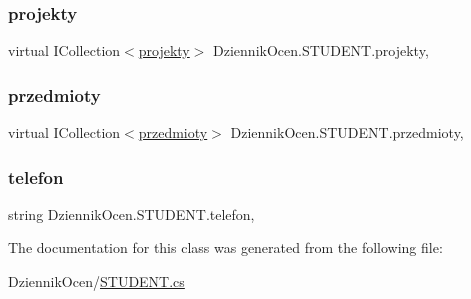 \subsubsection{\texorpdfstring{projekty}{projekty}}
{\footnotesize\ttfamily virtual I\+Collection$<$\hyperlink{class_dziennik_ocen_1_1projekty}{projekty}$>$ Dziennik\+Ocen.\+S\+T\+U\+D\+E\+N\+T.\+projekty\hspace{0.3cm}{\ttfamily [get]}, {\ttfamily [set]}}

\mbox{\label{class_dziennik_ocen_1_1_s_t_u_d_e_n_t_a090aaef3f9d6a0d20e319d773b2a4cbb}} 
\subsubsection{\texorpdfstring{przedmioty}{przedmioty}}
{\footnotesize\ttfamily virtual I\+Collection$<$\hyperlink{class_dziennik_ocen_1_1przedmioty}{przedmioty}$>$ Dziennik\+Ocen.\+S\+T\+U\+D\+E\+N\+T.\+przedmioty\hspace{0.3cm}{\ttfamily [get]}, {\ttfamily [set]}}

\mbox{\label{class_dziennik_ocen_1_1_s_t_u_d_e_n_t_ac1de4fe0b98bfb555e0fadbe1d146492}} 
\subsubsection{\texorpdfstring{telefon}{telefon}}
{\footnotesize\ttfamily string Dziennik\+Ocen.\+S\+T\+U\+D\+E\+N\+T.\+telefon\hspace{0.3cm}{\ttfamily [get]}, {\ttfamily [set]}}



The documentation for this class was generated from the following file\+:\begin{DoxyCompactItemize}
\item 
Dziennik\+Ocen/\hyperlink{_s_t_u_d_e_n_t_8cs}{S\+T\+U\+D\+E\+N\+T.\+cs}\end{DoxyCompactItemize}
